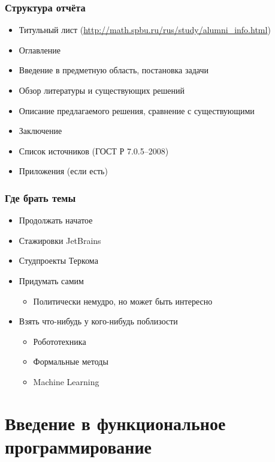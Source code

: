 \documentclass[xetex,mathserif,serif]{beamer}
\begin{document}
	\begin{frame}
		\frametitle{Структура отчёта}
		\begin{itemize}
			\item Титульный лист (\url{http://math.spbu.ru/rus/study/alumni\_info.html})
			\item Оглавление
			\item Введение в предметную область, постановка задачи
			\item Обзор литературы и существующих решений
			\item Описание предлагаемого решения, сравнение с существующими
			\item Заключение
			\item Список источников (ГОСТ Р 7.0.5--2008)
			\item Приложения (если есть)
		\end{itemize}
	\end{frame}
	
	\begin{frame}
		\frametitle{Где брать темы}
		\begin{itemize}
			\item Продолжать начатое
			\item Стажировки JetBrains
			\item Студпроекты Теркома
			\item Придумать самим 
			\begin{itemize}
				\item Политически немудро, но может быть интересно
			\end{itemize}
			\item Взять что-нибудь у кого-нибудь поблизости
			\begin{itemize}
				\item Робототехника
				\item Формальные методы
				\item Machine Learning
			\end{itemize}
		\end{itemize}
	\end{frame}
	
	\section{Введение в функциональное программирование}
	
\end{document}
